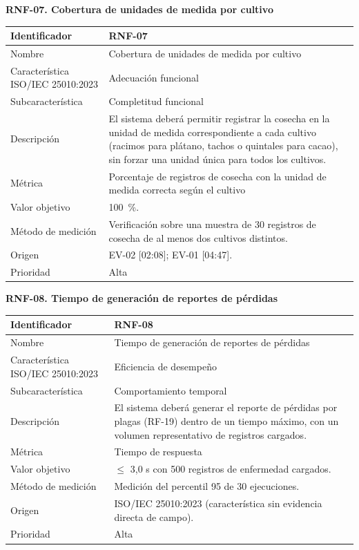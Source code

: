 \documentclass[12pt,a4paper]{article}
\begin{document}
\bigskip
\noindent\textbf{RNF-07. Cobertura de unidades de medida por cultivo}
\label{tab:RNF-07}

\begin{center}
\begin{longtable}{|p{4.2cm}|p{10cm}|}
\hline
Identificador & RNF-07 \\
\hline
Nombre & Cobertura de unidades de medida por cultivo \\
\hline
Característica ISO/IEC 25010:2023 & Adecuación funcional \\
\hline
Subcaracterística & Completitud funcional \\
\hline
Descripción & El sistema deberá permitir registrar la cosecha en la unidad de medida correspondiente a cada cultivo (racimos para plátano, tachos o quintales para cacao), sin forzar una unidad única para todos los cultivos. \\
\hline
Métrica & Porcentaje de registros de cosecha con la unidad de medida correcta según el cultivo \\
\hline
Valor objetivo & 100~\%. \\
\hline
Método de medición & Verificación sobre una muestra de 30 registros de cosecha de al menos dos cultivos distintos. \\
\hline
Origen & EV-02 [02:08]; EV-01 [04:47]. \\
\hline
Prioridad & Alta \\
\hline
\end{longtable}
\end{center}

\bigskip
\noindent\textbf{RNF-08. Tiempo de generación de reportes de pérdidas}
\label{tab:RNF-08}

\begin{center}
\begin{longtable}{|p{4.2cm}|p{10cm}|}
\hline
Identificador & RNF-08 \\
\hline
Nombre & Tiempo de generación de reportes de pérdidas \\
\hline
Característica ISO/IEC 25010:2023 & Eficiencia de desempeño \\
\hline
Subcaracterística & Comportamiento temporal \\
\hline
Descripción & El sistema deberá generar el reporte de pérdidas por plagas (RF-19) dentro de un tiempo máximo, con un volumen representativo de registros cargados. \\
\hline
Métrica & Tiempo de respuesta \\
\hline
Valor objetivo & $\leq$ 3,0 s con 500 registros de enfermedad cargados. \\
\hline
Método de medición & Medición del percentil 95 de 30 ejecuciones. \\
\hline
Origen & ISO/IEC 25010:2023 (característica sin evidencia directa de campo). \\
\hline
Prioridad & Alta \\
\hline
\end{longtable}
\end{center}
\end{document}
